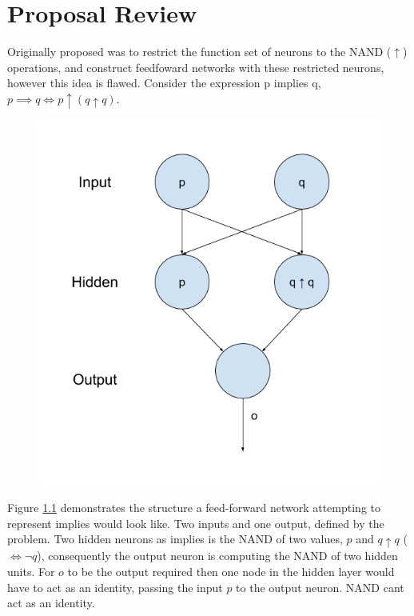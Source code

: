 \chapter{Proposal Review}\label{C:proposalreview}
Originally proposed was to restrict the function set of neurons to the NAND ($\uparrow$) operations, and construct feedfoward networks with these restricted neurons, however this idea is flawed. Consider the expression p implies q, $p \implies q \iff p \uparrow (q \uparrow q)$.

\begin{figure}[H]
  \centering
  \begin{minipage}[b]{0.6\textwidth}
    \includegraphics[width=\textwidth]{implys-nand-net.png}
    \caption{}
    \label{fig:implys-nand-net}
  \end{minipage}
  \hfill
\end{figure}

Figure \ref{fig:implys-nand-net} demonstrates the structure a feed-forward network attempting to represent implies would look like. Two inputs and one output, defined by the problem. Two hidden neurons as implies is the NAND of two values, $p$ and $q \uparrow q$ ($\iff \lnot q$), consequently the output neuron is computing the NAND of two hidden units. For $o$ to be the output required then one node in the hidden layer would have to act as an identity, passing the input $p$ to the output neuron. NAND cant act as an identity.